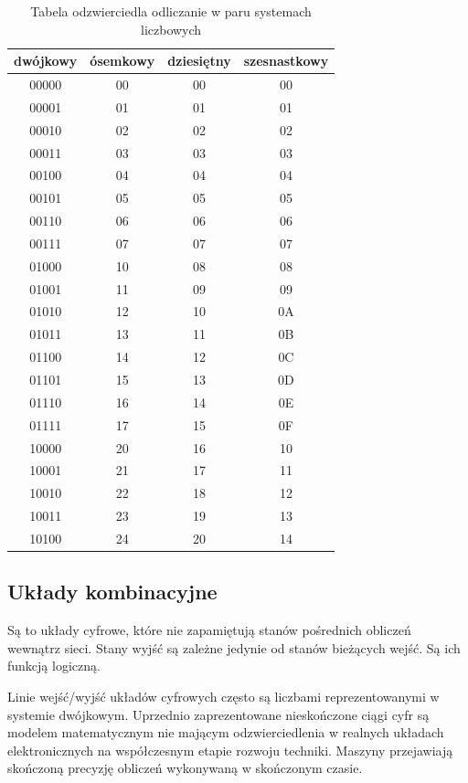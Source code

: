 \documentclass[a4paper,12pt]{article}
\begin{document}
\begin{table}[h!]
\centering
\begin{tabular}{ | c | c | c | c |}
  \hline
  dwójkowy & ósemkowy & dziesiętny & szesnastkowy \\ \hline
  00000 & 00 & 00 & 00 \\
  00001 & 01 & 01 & 01 \\
  00010 & 02 & 02 & 02 \\
  00011 & 03 & 03 & 03 \\
  00100 & 04 & 04 & 04 \\
  00101 & 05 & 05 & 05 \\
  00110 & 06 & 06 & 06 \\
  00111 & 07 & 07 & 07 \\
  01000 & 10 & 08 & 08 \\
  01001 & 11 & 09 & 09 \\
  01010 & 12 & 10 & 0A \\
  01011 & 13 & 11 & 0B \\
  01100 & 14 & 12 & 0C \\
  01101 & 15 & 13 & 0D \\
  01110 & 16 & 14 & 0E \\
  01111 & 17 & 15 & 0F \\
  10000 & 20 & 16 & 10 \\
  10001 & 21 & 17 & 11 \\
  10010 & 22 & 18 & 12 \\
  10011 & 23 & 19 & 13 \\
  10100 & 24 & 20 & 14 \\
  \hline
\end{tabular}
\caption*{Tabela odzwierciedla odliczanie w paru systemach liczbowych}
\end{table}


\subsection{Układy kombinacyjne}

Są to układy cyfrowe, które nie zapamiętują stanów pośrednich obliczeń wewnątrz sieci. Stany wyjść są zależne jedynie od stanów bieżących wejść. Są ich funkcją logiczną.

Linie wejść/wyjść układów cyfrowych często są liczbami reprezentowanymi w systemie dwójkowym. Uprzednio zaprezentowane nieskończone ciągi cyfr są modelem matematycznym nie mającym odzwierciedlenia w realnych układach elektronicznych na współczesnym etapie rozwoju techniki. Maszyny przejawiają skończoną precyzję obliczeń wykonywaną w skończonym czasie.
\end{document}
